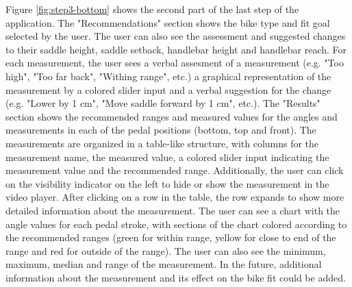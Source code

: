 Figure \ref{fig:step3-bottom} shows the second part of the last step of the application. The "Recommendations" section shows the bike type and fit goal selected by the user. The user can also see the assessment and suggested changes to their saddle height, saddle setback, handlebar height and handlebar reach. For each measurement, the user sees a verbal assesment of a measurement (e.g. "Too high", "Too far back", "Withing range", etc.) a graphical representation of the measurement by a colored slider input and a verbal suggestion for the change (e.g. "Lower by 1 cm", "Move saddle forward by 1 cm", etc.). The "Results" section shows the recommended ranges and measured values for the angles and measurements in each of the pedal positions (bottom, top and front). The measurements are organized in a table-like structure, with columns for the measurement name, the measured value, a colored slider input indicating the measurement value and the recommended range. Additionally, the user can click on the visibility indicator on the left to hide or show the measurement in the video player. After clicking on a row in the table, the row expands to show more detailed information about the measurement. The user can see a chart with the angle values for each pedal stroke, with sections of the chart colored according to the recommended ranges (green for within range, yellow for close to end of the range and red for outside of the range). The user can also see the minimum, maximum, median and range of the measurement. In the future, additional information about the measurement and its effect on the bike fit could be added.

